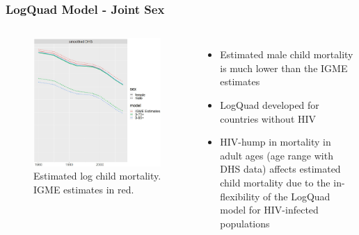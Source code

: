 \documentclass[hyperref={colorlinks, citecolor=blue}]{beamer}
\begin{document}
\begin{frame}
\frametitle{LogQuad Model - Joint Sex}
\begin{columns}
\begin{figure}
\includegraphics[width=\linewidth]{Graphs/joint h.jpg}
\caption{Estimated log child mortality. \\IGME estimates in red.}
\end{figure}
\begin{itemize}
\item Estimated male child mortality is much lower than the IGME estimates
\item LogQuad developed for countries without HIV
\item HIV-hump in mortality in adult ages (age range with DHS data) affects estimated child mortality due to the in-flexibility of the LogQuad model for HIV-infected populations
\end{itemize}
\end{columns}
\end{frame}
\end{document}
